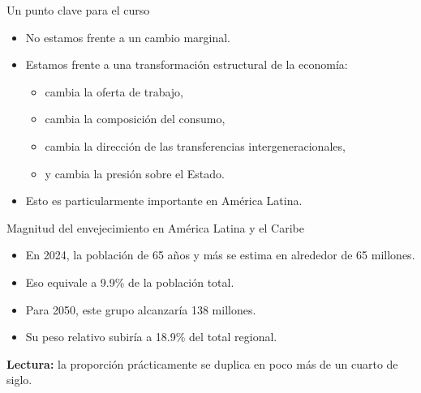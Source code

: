 \documentclass{beamer}
\begin{document}
\begin{frame}{Un punto clave para el curso}
\begin{itemize}
    \item No estamos frente a un cambio marginal.
    \item Estamos frente a una transformación estructural de la economía:
    \begin{itemize}
        \item cambia la oferta de trabajo,
        \item cambia la composición del consumo,
        \item cambia la dirección de las transferencias intergeneracionales,
        \item y cambia la presión sobre el Estado.
    \end{itemize}
    \item Esto es particularmente importante en América Latina.
\end{itemize}
\end{frame}

\begin{frame}{Magnitud del envejecimiento en América Latina y el Caribe}
\begin{itemize}
    \item En 2024, la población de 65 años y más se estima en alrededor de 65 millones.
    \item Eso equivale a 9.9\% de la población total.
    \item Para 2050, este grupo alcanzaría 138 millones.
    \item Su peso relativo subiría a 18.9\% del total regional.
\end{itemize}

\vspace{0.3cm}
\textbf{Lectura:} la proporción prácticamente se duplica en poco más de un cuarto de siglo.
\end{frame}
\end{document}
